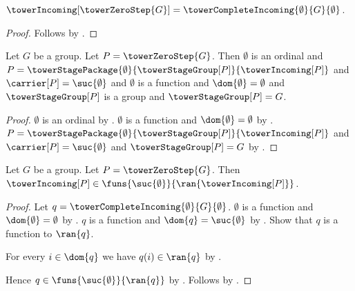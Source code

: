 \begin{proposition}\label{tower_zero_step_incoming}
    $\towerIncoming[\towerZeroStep{G}]=
        \towerCompleteIncoming{\emptyset}{G}{\emptyset}$.
\end{proposition}
\begin{proof}
    Follows by
        .
\end{proof}

\begin{proposition}\label{tower_zero_step_data}
    Let $G$ be a group.
    Let $P=\towerZeroStep{G}$.
    Then $\emptyset$ is an ordinal and
        $P=\towerStagePackage{\emptyset}
            {\towerStageGroup[P]}{\towerIncoming[P]}$ and
        $\carrier[P]=\suc{\emptyset}$ and
        $\emptyset$ is a function and $\dom{\emptyset}=\emptyset$ and
        $\towerStageGroup[P]$ is a group and
        $\towerStageGroup[P]=G$.
\end{proposition}
\begin{proof}
    $\emptyset$ is an ordinal by .
    $\emptyset$ is a function and $\dom{\emptyset}=\emptyset$ by
        .
    $P=\towerStagePackage{\emptyset}
        {\towerStageGroup[P]}{\towerIncoming[P]}$ and
        $\carrier[P]=\suc{\emptyset}$ and
        $\towerStageGroup[P]=G$ by
        .
\end{proof}

\begin{proposition}\label{tower_zero_step_incoming_type}
    Let $G$ be a group.
    Let $P=\towerZeroStep{G}$.
    Then $\towerIncoming[P]\in
        \funs{\suc{\emptyset}}{\ran{\towerIncoming[P]}}$.
\end{proposition}
\begin{proof}
    Let $q=\towerCompleteIncoming{\emptyset}{G}{\emptyset}$.
    $\emptyset$ is a function and $\dom{\emptyset}=\emptyset$ by
        .
    $q$ is a function and $\dom{q}=\suc{\emptyset}$ by
        .
    Show that $q$ is a function to $\ran{q}$.
    \begin{subproof}
        For every $i\in\dom{q}$ we have $q(i)\in\ran{q}$ by
            .
    \end{subproof}
    Hence $q\in\funs{\suc{\emptyset}}{\ran{q}}$ by
        .
    Follows by .
\end{proof}

